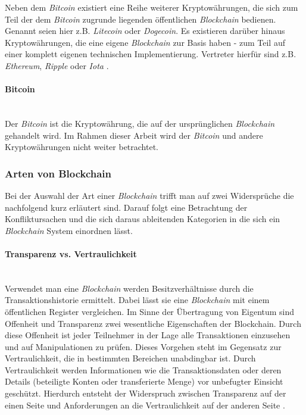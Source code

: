 Neben dem \textit{Bitcoin} existiert eine Reihe weiterer Kryptowährungen, die sich zum Teil der dem \textit{Bitcoin} zugrunde liegenden öffentlichen \textit{Blockchain} bedienen. Genannt seien hier z.B. \textit{Litecoin} oder \textit{Dogecoin}. Es existieren darüber hinaus Kryptowährungen, die eine eigene \textit{Blockchain} zur Basis haben - zum Teil auf einer komplett eigenen technischen Implementierung. Vertreter hierfür sind z.B. \textit{Ethereum}, \textit{Ripple} oder \textit{Iota} \citep[siehe auch][]{Buterin2014, carVertical, JPMorgan2018}.

\paragraph{Bitcoin}$~~$\\
Der \textit{Bitcoin} ist die Kryptowährung, die auf der ursprünglichen \textit{Blockchain} gehandelt wird. Im Rahmen dieser Arbeit wird der \textit{Bitcoin} und andere Kryptowährungen nicht weiter betrachtet.

\subsubsection{Arten von Blockchain} \label{Arten-von-Blockchain}
Bei der Auswahl der Art einer \textit{Blockchain} trifft man auf zwei Widersprüche die nachfolgend kurz erläutert sind. Darauf folgt eine Betrachtung der Konfliktursachen und die sich daraus ableitenden Kategorien in die sich ein \textit{Blockchain} System einordnen lässt.

\paragraph{Transparenz vs. Vertraulichkeit}$~~$\\
Verwendet man eine \textit{Blockchain} werden Besitzverhältnisse durch die Transaktionshistorie ermittelt. Dabei lässt sie eine \textit{Blockchain} mit einem öffentlichen Register vergleichen. Im Sinne der Übertragung von Eigentum sind Offenheit und Transparenz zwei wesentliche Eigenschaften der Blockchain. Durch diese Offenheit ist jeder Teilnehmer in der Lage alle Transaktionen einzusehen und auf Manipulationen zu prüfen. Dieses Vorgehen steht im Gegensatz zur Vertraulichkeit, die in bestimmten Bereichen unabdingbar ist. Durch Vertraulichkeit werden Informationen wie die Transaktionsdaten oder deren Details (beteiligte Konten oder transferierte Menge) vor unbefugter Einsicht geschützt. Hierdurch entsteht der Widerspruch zwischen Transparenz auf der einen Seite und Anforderungen an die Vertraulichkeit auf der anderen Seite \citep{Drescher2017}.

